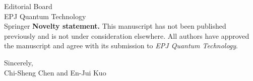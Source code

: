 \documentclass[11pt]{letter}
\begin{document}
\begin{letter}{Editorial Board \\ EPJ Quantum Technology \\ Springer}
\textbf{Novelty statement.}
This manuscript has not been published previously and is not under consideration elsewhere. All authors have approved the manuscript and agree with its submission to \textit{EPJ Quantum Technology}.

\closing{Sincerely,\\[1em]
Chi-Sheng Chen and En-Jui Kuo}

\end{letter}
\end{document}
